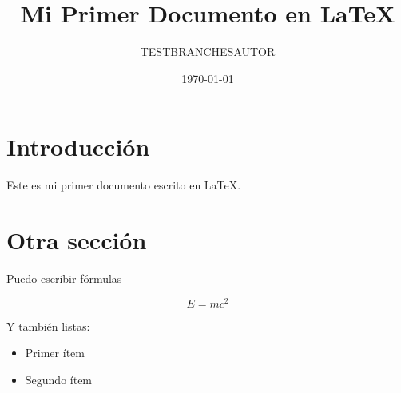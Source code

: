 \documentclass{article} %
\title{Mi Primer Documento en LaTeX}
\author{TESTBRANCHESAUTOR}
\date{\today} %
\begin{document}
\maketitle

\section{Introducción}

Este es mi primer documento escrito en \LaTeX. 

\section{Otra sección}

Puedo escribir fórmulas

\[
E = mc^2
\]

Y también listas:
\begin{itemize}
  \item Primer ítem
  \item Segundo ítem
\end{itemize}
\end{document}
